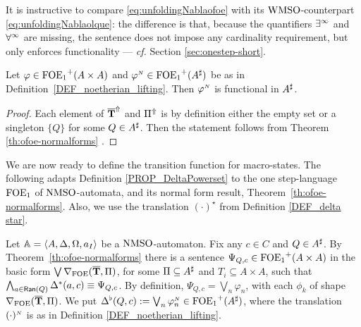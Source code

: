 It is instructive to compare \eqref{eq:unfoldingNablaofoe} with its 
$\mathrm{WMSO}$-counterpart \eqref{eq:unfoldingNablaolque}: the difference is that, 
because the quantifiers $\exists^\infty$ and $\forall^\infty$ are missing, the sentence does not 
impose any cardinality requirement, but only enforces functionality --- \emph{cf.} Section \ref{sec:onestep-short}. 

\begin{lemma}\label{lemma:automatafunctionalsentence}
Let $\varphi \in {\ensuremath{\mathrm{FOE}_1}}^+(A \times A)$ and $\varphi^{{\scriptscriptstyle N}}\in {\ensuremath{\mathrm{FOE}_1}}^+(A^{\sharp} )$ be as in Definition~\ref{DEF_noetherian_lifting}. Then $\varphi^{{\scriptscriptstyle N}}$ is functional in $A^{\sharp}$.
 \end{lemma}
\begin{proof}
Each element of $\overline{{\mathbf{T}}}^{\Uparrow}$ and $\Pi^{\Uparrow}$ is by definition either the empty set or a singleton $\{Q\}$ for some $Q \in A^{\sharp}$. Then the statement follows from Theorem \ref{th:ofoe-normalforms} .\end{proof}

 We are now ready to define the transition function for macro-states. The following adapts Definition \ref{PROP_DeltaPowerset} to the one step-language $\mathrm{FOE}_1$ of $\mathrm{NMSO}$-automata, and its normal form result, Theorem~\ref{th:ofoe-normalforms}. Also, we use the translation $(\cdot)^{\star}$ from Definition \ref{DEF_delta star}.
\begin{definition}\label{PROP_DeltaPowerset_noet}
Let $\mathbb{A} = \langle{A,\Delta,\Omega,a_I}\rangle$ be a $\mathrm{NMSO}$-automaton. Fix any $c \in C$ and $Q \in A^{\sharp}$. By Theorem~\ref{th:ofoe-normalforms} there is a sentence $\Psi_{Q,c} \in {\ensuremath{\mathrm{FOE}_1}}^+(A\times A)$ in the basic form $\bigvee \nabla_{\mathrm{FOE}}(\overline{{\mathbf{T}}},\Pi)$, for some $\Pi \subseteq A^{\sharp}$ and $T_i \subseteq A \times A$, such that $\bigwedge_{a \in \mathsf{Ran}(Q)} \Delta^{*}(a,c) \equiv \Psi_{Q,c}$.
By definition, $\Psi_{Q,c} = \bigvee_{n}\varphi_n$, with each $\phi_{k}$ of shape $\nabla_{\mathrm{FOE}}(\overline{{\mathbf{T}}},\Pi)$.
%
We put $\Delta^{\flat}(Q,c) := \bigvee_{n}\varphi_n^{{\scriptscriptstyle N}}  \in {\ensuremath{\mathrm{FOE}_1}}^+(A^{\sharp})$, where the translation $(\cdot)^{{\scriptscriptstyle N}}$ is as in Definition \ref{DEF_noetherian_lifting}.
\end{definition}

